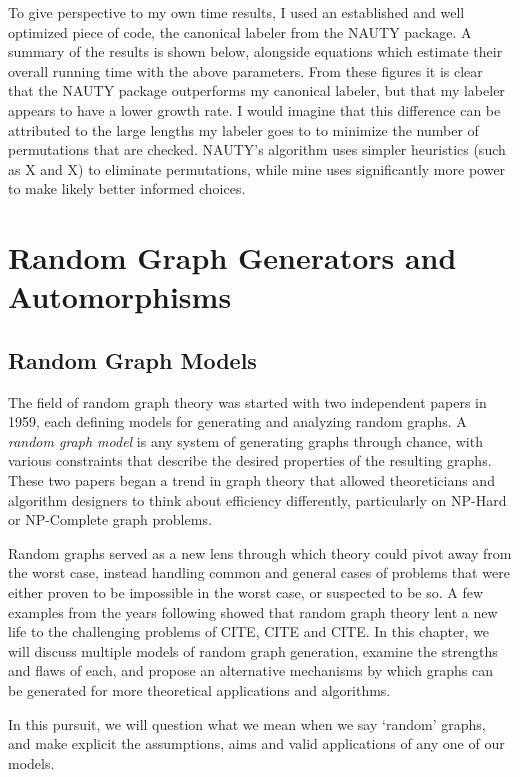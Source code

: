 \documentclass[11pt,a4paper]{report}
\begin{document}
To give perspective to my own time results, I used an established and well optimized piece of code, the canonical labeler from the NAUTY package.
A summary of the results is shown below, alongside equations which estimate their overall running time with the above parameters.
From these figures it is clear that the NAUTY package outperforms my canonical labeler, but that my labeler appears to have a lower growth rate.
I would imagine that this difference can be attributed to the large lengths my labeler goes to to minimize the number of permutations that are checked.
NAUTY's algorithm uses simpler heuristics (such as X and X) to eliminate permutations, while mine uses significantly more power to make likely better informed choices.



\chapter{Random Graph Generators and Automorphisms}

\section{Random Graph Models}


The field of random graph theory was started with two independent papers in 1959, each defining models for generating and analyzing random graphs.
A \emph{random graph model} is any system of generating graphs through chance, with various constraints that describe the desired properties of the resulting graphs.
These two papers began a trend in graph theory that allowed theoreticians and algorithm designers to think about efficiency differently, particularly on NP-Hard or NP-Complete graph problems.

Random graphs served as a new lens through which theory could pivot away from the worst case, instead handling common and general cases of problems that were either proven to be impossible in the worst case, or suspected to be so. 
A few examples from the years following showed that random graph theory lent a new life to the challenging problems of CITE, CITE and CITE.
In this chapter, we will discuss multiple models of random graph generation, examine the strengths and flaws of each, and propose an alternative mechanisms by which graphs can be generated for more theoretical applications and algorithms.

In this pursuit, we will question what we mean when we say `random' graphs, and make explicit the assumptions, aims and valid applications of any one of our models. 
\end{document}
